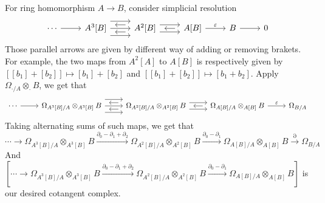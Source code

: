 \documentclass{ctexart}
\begin{document}
For ring homomorphism $A \rightarrow B$, consider simplicial resolution
\begin{equation}
    \begin{tikzcd}
        \cdots \arrow[r] &
        A^{3}[B] \arrow[r, shift left = 2ex] \arrow[r] \arrow[r, shift right = 2ex] &
        A^{2}[B] \arrow[r, shift left = 1ex] \arrow[r, shift right = 1ex] \arrow[l, shift left = 1ex, shorten = 2mm] \arrow[l, shift right = 1ex, shorten = 2mm] &
        A[B] \arrow[r, "\varepsilon"] \arrow[l, shorten = 2mm] &
        B \arrow[r] &
        0
    \end{tikzcd}
\end{equation}
Those parallel arrows are given by different way of adding or removing brakets.
For example, the two maps from $A^{2}[A]$ to $A[B]$ is respectively given by $[[b_{1}] + [b_{2}]] \mapsto [b_{1}] + [b_{2}]$ and $[[b_{1}] + [b_{2}]] \mapsto [b_{1} + b_{2}]$.
Apply $\Omega_{\cdot/A} \otimes_{\cdot} B$, we get that
\begin{equation*}
    \begin{tikzcd}
        \cdots \arrow[r] &
        \Omega_{A^{3}[B]/A} \otimes_{A^{3}[B]} B \arrow[r, shift left = 2ex] \arrow[r] \arrow[r, shift right = 2ex] &
        \Omega_{A^{2}[B]/A} \otimes_{A^{2}[B]} B \arrow[r, shift left = 1ex] \arrow[r, shift right = 1ex] \arrow[l, shift left = 1ex, shorten = 2mm] \arrow[l, shift right = 1ex, shorten = 2mm] &
        \Omega_{A[B]/A} \otimes_{A[B]} B \arrow[r, "\varepsilon"] \arrow[l, shorten = 2mm] &
        \Omega_{B/A}
    \end{tikzcd}
\end{equation*}
Taking alternating sums of such maps, we get that
\begin{equation}
    \cdots \longrightarrow \Omega_{A^{3}[B]/A} \otimes_{A^{3}[B]} B \overset{\partial_{0} - \partial_{1} + \partial_{2}}{\longrightarrow} \Omega_{A^{2}[B]/A} \otimes_{A^{2}[B]} B \overset{\partial_{0} - \partial_{1}}{\longrightarrow} \Omega_{A[B]/A} \otimes_{A[B]} B \overset{\partial}{\longrightarrow} \Omega_{B/A}
\end{equation}
And $[\cdots \rightarrow \Omega_{A^{3}[B]/A} \otimes_{A^{3}[B]} B \overset{\partial_{0} - \partial_{1} + \partial_{2}}{\rightarrow} \Omega_{A^{2}[B]/A} \otimes_{A^{2}[B]} B \overset{\partial_{0} - \partial_{1}}{\rightarrow} \Omega_{A[B]/A} \otimes_{A[B]} B]$ is our desired cotangent complex.
\end{document}
